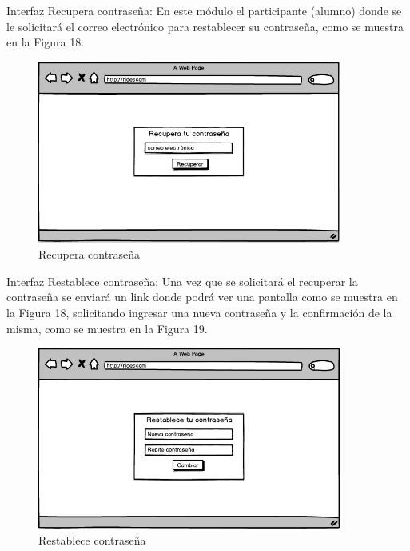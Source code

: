 	Interfaz Recupera contraseña: En este módulo el participante (alumno) donde se le solicitará el correo electrónico para restablecer su contraseña, como se muestra en la Figura 18. 
	\begin{figure}[hbt!]
		\centering
		\includegraphics[width=10cm, height=6cm]{Imagenes/Disenos/Recuperacontrasena.png}
		\caption{Recupera contraseña}
	\end{figure}
	
	Interfaz Restablece contraseña: Una vez que se solicitará el recuperar la contraseña se enviará un link donde podrá ver una pantalla como se muestra en la Figura 18, solicitando ingresar una nueva contraseña y la confirmación de la misma, como se muestra en la Figura 19.
	\begin{figure}[hbt!]
		\centering
		\includegraphics[width=10cm, height=6cm]{Imagenes/Disenos/Restablecercontra.png}
		\caption{Restablece contraseña}
	\end{figure}
	
